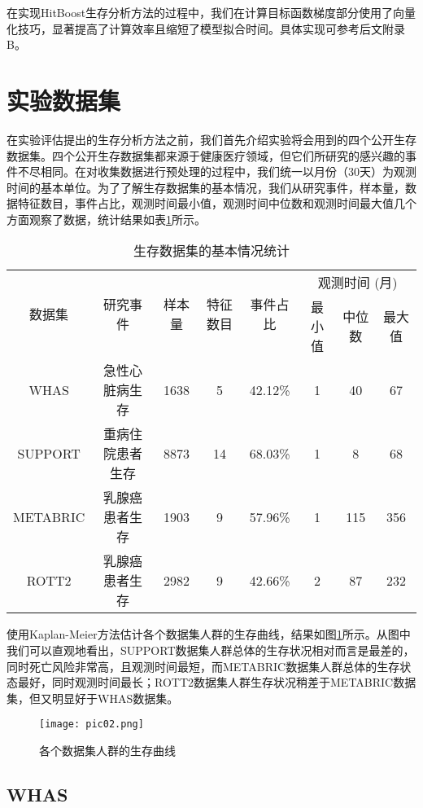 在实现HitBoost生存分析方法的过程中，我们在计算目标函数梯度部分使用了向量化技巧，显著提高了计算效率且缩短了模型拟合时间。具体实现可参考后文附录B。

\section{实验数据集}

在实验评估提出的生存分析方法之前，我们首先介绍实验将会用到的四个公开生存数据集。四个公开生存数据集都来源于健康医疗领域，但它们所研究的感兴趣的事件不尽相同。在对收集数据进行预处理的过程中，我们统一以月份（30天）为观测时间的基本单位。为了了解生存数据集的基本情况，我们从研究事件，样本量，数据特征数目，事件占比，观测时间最小值，观测时间中位数和观测时间最大值几个方面观察了数据，统计结果如表\ref{table01}所示。

\begin{table}[H]
\caption{生存数据集的基本情况统计}
\begin{tabular}{cccccccc}
\toprule
\multirow{2}{*}{数据集} & \multirow{2}{*}{研究事件} & \multirow{2}{*}{样本量} & \multirow{2}{*}{特征数目} & \multirow{2}{*}{事件占比} & \multicolumn{3}{c}{观测时间 (月)} \\ \cline{6-8} 
&  &  &  &  & 最小值 & 中位数 & 最大值 \\ 
\midrule
WHAS & 急性心脏病生存 & 1638 & 5 & 42.12\% & 1 & 40 & 67 \\
SUPPORT & 重病住院患者生存 & 8873 & 14 & 68.03\% & 1 & 8 & 68 \\
METABRIC & 乳腺癌患者生存 & 1903 & 9 & 57.96\% & 1 & 115 & 356 \\
ROTT2 & 乳腺癌患者生存 & 2982 & 9 & 42.66\% & 2 & 87 & 232 \\
\bottomrule
\end{tabular}
\label{table01}
\end{table}

使用Kaplan-Meier方法估计各个数据集人群的生存曲线，结果如图\ref{pic02}所示。从图中我们可以直观地看出，SUPPORT数据集人群总体的生存状况相对而言是最差的，同时死亡风险非常高，且观测时间最短，而METABRIC数据集人群总体的生存状态最好，同时观测时间最长；ROTT2数据集人群生存状况稍差于METABRIC数据集，但又明显好于WHAS数据集。

\begin{figure}[H]
\texttt{[image: pic02.png]}
\caption{各个数据集人群的生存曲线}
\label{pic02}
\end{figure}

\subsection{WHAS}

